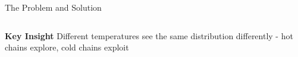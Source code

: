 \begin{frame}{The Problem and Solution}
\begin{columns}
\begin{tikzpicture}[scale=0.6]
		\end{tikzpicture}

	\end{columns}

			\vspace{0.2cm}
	\textbf{Key Insight}
		Different temperatures see the same distribution differently - hot chains explore, cold chains exploit

\end{frame}






